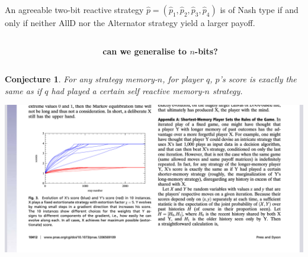 \documentclass{beamer}
\newtheorem{conjecture}[theorem]{Conjecture}
\begin{document}
\begin{frame}
    \begin{Lemma}
        An agreeable two-bit reactive strategy \(\hat{p} =
        (\hat{p}_1,\hat{p}_2,\hat{p}_3,\hat{p}_4)\) is of Nash type if and only
        if neither AllD nor the Alternator strategy yield a larger payoff.
    \end{Lemma}
\end{frame}

\begin{frame}
    \begin{center}
        \begin{columns}
            \centering
            \begin{column}{.5\textwidth}
            \centering
        
            \end{column}
        \begin{column}{.5\textwidth}
            \centering
            \textbf{can we generalise to $n$-bits?}
        \end{column}
    \end{columns}
    \end{center}
\end{frame}



\begin{frame}
    \begin{conjecture}
    For any strategy memory-$n$, for player \(q\), \(p\)'s score is exactly the
    same as if \(q\) had played a certain self reactive memory-$n$ strategy.
    \end{conjecture}
\end{frame}

\begin{frame}
    \centering
    \includegraphics[width=\textwidth]{static/press_and_dyson.png}
\end{frame}
\end{document}
